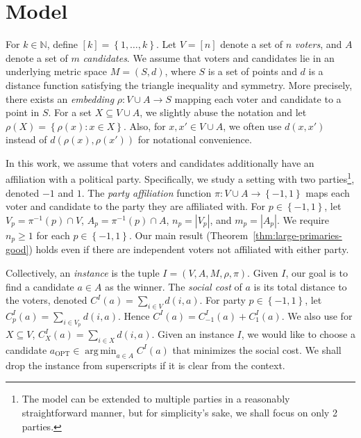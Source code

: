 \documentclass[letterpaper]{article} %
\theoremstyle{definition}
\newcommand{\set}[1]{\left\{#1\right\}}
\DeclareMathOperator*{\argmin}{\arg\,\min}
\newcommand{\bbN}{\mathbb{N}}
\newcommand{\pleft}{-1}
\newcommand{\pright}{1}
\newcommand{\opt}{{\textrm{OPT}}}
\begin{document}
\section{Model}
\label{sec:model}

For $k \in \bbN$, define $[k] = \set{1,\ldots,k}$. Let $V = [n]$ denote a set of $n$ \emph{voters}, and $A$ denote a set of $m$ \emph{candidates}. We assume that voters and candidates lie in an underlying metric space $M = (S,d)$, where $S$ is a set of points and $d$ is a distance function satisfying the triangle inequality and symmetry. More precisely, there exists an \emph{embedding} $\rho : V \cup A \to S$ mapping each voter and candidate to a point in $S$. For a set $X \subseteq V \cup A$, we slightly abuse the notation and let $\rho(X) = \set{\rho(x) : x \in X}$. Also, for $x,x' \in V \cup A$, we often use $d(x,x')$ instead of $d(\rho(x),\rho(x'))$ for notational convenience.

In this work, we assume that voters and candidates additionally have an affiliation with a political party. Specifically, we study a setting with two parties\footnote{The model can be extended to multiple parties in a reasonably straightforward manner, but for simplicity's sake, we shall focus on only 2 parties.}, denoted $\pleft$ and $\pright$. The \emph{party affiliation} function $\pi : V \cup A \to \set{\pleft,\pright}$ maps each voter and candidate to the party they are affiliated with. For $p \in \set{\pleft,\pright}$, let $V_p = \pi^{-1}(p) \cap V$, $A_p = \pi^{-1}(p) \cap A$, $n_p = |V_p|$, and $m_p = |A_p|$. We require $n_p \ge 1$ for each $p \in \set{\pleft,\pright}$. Our main result (Theorem~\ref{thm:large-primaries-good}) holds even if there are independent voters not affiliated with either party. %


Collectively, an \emph{instance} is the tuple $I = (V,A,M,\rho,\pi)$. Given $I$, our goal is to find a candidate $a \in A$ as the winner. The \emph{social cost} of $a$ is its total distance to the voters, denoted $C^I(a) = \sum_{i \in V} d(i,a)$. For party $p \in \set{\pleft,\pright}$, let $C^I_p(a) = \sum_{i \in V_p} d(i,a)$. Hence $C^I(a) = C^I_{\pleft}(a) + C^I_{\pright}(a)$. We also use for $X \subseteq V$, $C^I_X(a) = \sum_{i \in X} d(i,a)$. Given an instance $I$, we would like to choose a candidate $a_{\opt} \in \argmin_{a \in A} C^I(a)$ that minimizes the social cost. We shall drop the instance from superscripts if it is clear from the context.
\end{document}
